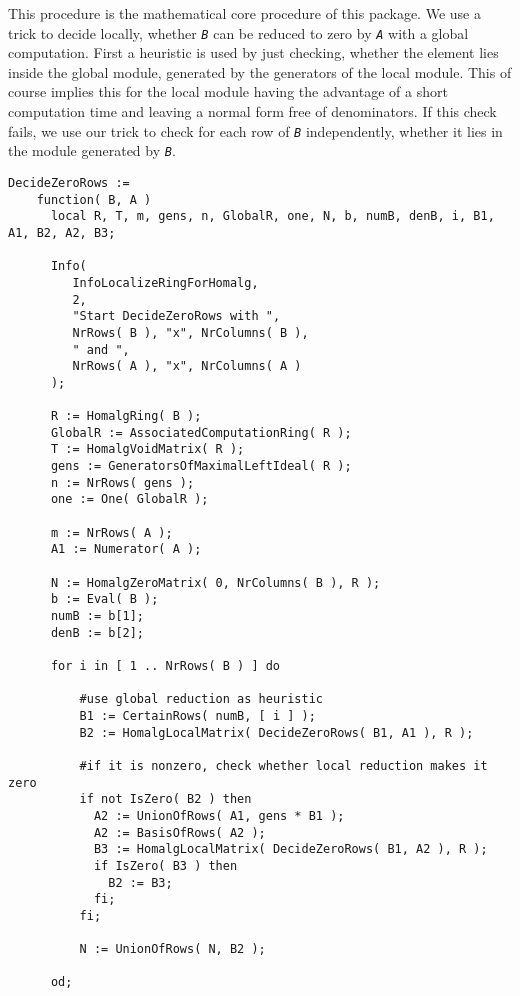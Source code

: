 \documentclass[a4paper,11pt]{report}
\begin{document}
{{{ This procedure is the mathematical core procedure of this package. We use a
trick to decide locally, whether \mbox{\texttt{\mdseries\slshape B}} can be reduced to zero by \mbox{\texttt{\mdseries\slshape A}} with a global computation. First a heuristic is used by just checking, whether
the element lies inside the global module, generated by the generators of the
local module. This of course implies this for the local module having the
advantage of a short computation time and leaving a normal form free of
denominators. If this check fails, we use our trick to check for each row of \mbox{\texttt{\mdseries\slshape B}} independently, whether it lies in the module generated by \mbox{\texttt{\mdseries\slshape B}}. 
\begin{Verbatim}[fontsize=\small,frame=single,label=Code]
  DecideZeroRows :=
    function( B, A )
      local R, T, m, gens, n, GlobalR, one, N, b, numB, denB, i, B1, A1, B2, A2, B3;
      
      Info( 
         InfoLocalizeRingForHomalg,
         2,
         "Start DecideZeroRows with ",
         NrRows( B ), "x", NrColumns( B ),
         " and ",
         NrRows( A ), "x", NrColumns( A ) 
      );
      
      R := HomalgRing( B );
      GlobalR := AssociatedComputationRing( R );
      T := HomalgVoidMatrix( R );
      gens := GeneratorsOfMaximalLeftIdeal( R );
      n := NrRows( gens );
      one := One( GlobalR );
      
      m := NrRows( A );
      A1 := Numerator( A );
      
      N := HomalgZeroMatrix( 0, NrColumns( B ), R );
      b := Eval( B );
      numB := b[1];
      denB := b[2];
      
      for i in [ 1 .. NrRows( B ) ] do
      
          #use global reduction as heuristic
          B1 := CertainRows( numB, [ i ] );
          B2 := HomalgLocalMatrix( DecideZeroRows( B1, A1 ), R );
          
          #if it is nonzero, check whether local reduction makes it zero
          if not IsZero( B2 ) then
            A2 := UnionOfRows( A1, gens * B1 );
            A2 := BasisOfRows( A2 );
            B3 := HomalgLocalMatrix( DecideZeroRows( B1, A2 ), R );
            if IsZero( B3 ) then
              B2 := B3;
            fi;
          fi;
          
          N := UnionOfRows( N, B2 );
          
      od;
      

\end{Verbatim}}}}
\end{document}
